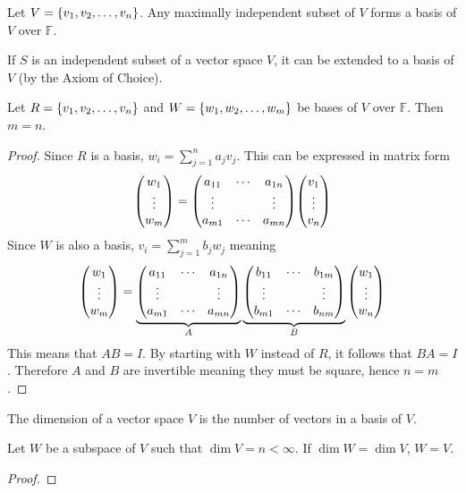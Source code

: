 \documentclass[../notes.tex]{subfiles}
\begin{document}
\begin{corollary}
	Let $V = \qty{v_1, v_2, \ldots, v_n}$. Any maximally independent subset of $V$ forms a basis of $V$ over $\mathbb{F}$.
\end{corollary}

\begin{theorem}
	If $S$ is an independent subset of a vector space $V$, it can be extended to a basis of $V$ (by the Axiom of Choice).
\end{theorem}

\begin{theorem}
	Let $R = \qty{v_1, v_2, \ldots, v_n}$ and $ W = \qty{w_1, w_2, \ldots, w_m}$ be bases of $V$ over $\mathbb{F}$. Then $m = n$.
\end{theorem}
\begin{proof}
	Since $R$ is a basis, $w_i = \sum_{j=1}^n a_j v_j$. This can be expressed in matrix form
	\[
		\mqty(w_1 \\ \vdots \\ w_m) = \mqty(a_{11} & \cdots & a_{1n} \\ \vdots & & \vdots \\ a_{m1} & \cdots & a_{mn}) \mqty(v_1 \\ \vdots \\ v_n)
	\]
	Since $W$ is also a basis, $v_i = \sum_{j=1}^m b_j w_j$ meaning
	\[
		\mqty(w_1 \\ \vdots \\ w_m) = 
		\underbrace{\mqty(a_{11} & \cdots & a_{1n} \\ \vdots & & \vdots \\ a_{m1} & \cdots & a_{mn})}_A
		\underbrace{\mqty(b_{11} & \cdots & b_{1m} \\ \vdots & & \vdots \\ b_{m1} & \cdots & b_{nm})}_B
		\mqty(w_1 \\ \vdots \\ w_n)
	\]
	This means that $AB = I$. By starting with $W$ instead of $R$, it follows that $BA = I$. Therefore $A$ and $B$ are invertible meaning they must be square, hence $n = m$.
\end{proof}

\begin{definition}[Dimension]
	The dimension of a vector space $V$ is the number of vectors in a basis of $V$.
\end{definition}

\begin{theorem}
	Let $W$ be a subspace of $V$ such that $\dim V = n < \infty$. If $\dim W = \dim V$, $W = V$.
\end{theorem}
\begin{proof}
	
\end{proof}
	
\end{document}
